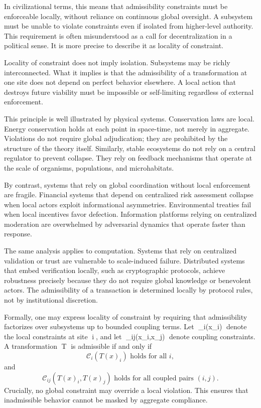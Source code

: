 \documentclass[12pt,oneside]{book}
\begin{document}
In civilizational terms, this means that admissibility constraints must be enforceable locally, without reliance on continuous global oversight. A subsystem must be unable to violate constraints even if isolated from higher-level authority. This requirement is often misunderstood as a call for decentralization in a political sense. It is more precise to describe it as locality of constraint.

Locality of constraint does not imply isolation. Subsystems may be richly interconnected. What it implies is that the admissibility of a transformation at one site does not depend on perfect behavior elsewhere. A local action that destroys future viability must be impossible or self-limiting regardless of external enforcement.

This principle is well illustrated by physical systems. Conservation laws are local. Energy conservation holds at each point in space-time, not merely in aggregate. Violations do not require global adjudication; they are prohibited by the structure of the theory itself. Similarly, stable ecosystems do not rely on a central regulator to prevent collapse. They rely on feedback mechanisms that operate at the scale of organisms, populations, and microhabitats.

By contrast, systems that rely on global coordination without local enforcement are fragile. Financial systems that depend on centralized risk assessment collapse when local actors exploit informational asymmetries. Environmental treaties fail when local incentives favor defection. Information platforms relying on centralized moderation are overwhelmed by adversarial dynamics that operate faster than response.

The same analysis applies to computation. Systems that rely on centralized validation or trust are vulnerable to scale-induced failure. Distributed systems that embed verification locally, such as cryptographic protocols, achieve robustness precisely because they do not require global knowledge or benevolent actors. The admissibility of a transaction is determined locally by protocol rules, not by institutional discretion.

Formally, one may express locality of constraint by requiring that admissibility factorizes over subsystems up to bounded coupling terms. Let _i(x_i) denote the local constraints at site i, and let _{ij}(x_i,x_j) denote coupling constraints. A transformation T is admissible if and only if
\[
\mathcal{C}_i(T(x)_i) \text{ holds for all } i,
\]
and
\[
\mathcal{C}_{ij}(T(x)_i,T(x)_j) \text{ holds for all coupled pairs } (i,j).
\]
Crucially, no global constraint may override a local violation. This ensures that inadmissible behavior cannot be masked by aggregate compliance.
\end{document}
